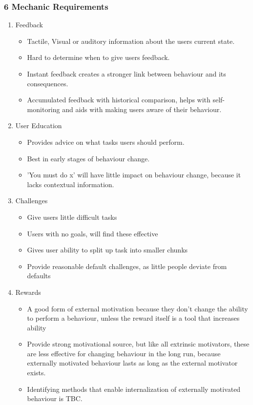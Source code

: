   \subsubsection*{6 Mechanic Requirements}

    \begin{enumerate}
      \item Feedback
        \begin{itemize}
          \item Tactile, Visual or auditory information about the users current state.
          \item Hard to determine when to give users feedback.
          \item Instant feedback creates a stronger link between behaviour and its consequences.
          \item Accumulated feedback with historical comparison, helps with self-monitoring and aids with making users aware of their behaviour.
        \end{itemize}

      \item User Education
      \begin{itemize}
        \item Provides advice on what tasks users should perform.
        \item Best in early stages of behaviour change.
        \item 'You must do x' will have little impact on behaviour change, because it lacks contextual information.
      \end{itemize}

      \item Challenges
      \begin{itemize}
        \item Give users little difficult tasks
        \item Users with no goals, will find these effective
        \item Gives user ability to split up task into smaller chunks
        \item Provide reasonable default challenges, as little people deviate from defaults
      \end{itemize}

      \item Rewards
      \begin{itemize}
        \item A good form of external motivation because they don't change the ability to perform a behaviour, unless the reward itself is a tool that increases ability
        \item Provide strong motivational source, but like all extrinsic motivators, these are less effective for changing behaviour in the long run, because externally motivated behaviour lasts as long as the external motivator exists.
        \item Identifying methods that enable internalization of externally motivated behaviour is TBC.
      \end{itemize}


\end{enumerate}
